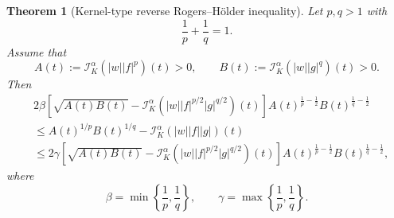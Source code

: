 \documentclass[11pt]{article}
\newtheorem{theorem}{Theorem}[section]
\begin{document}
\begin{theorem}[Kernel-type reverse Rogers--H\"older inequality]
Let $p,q>1$ with
\[
    \frac1p+\frac1q=1.
\]
Assume that
\[
    A(t):=\mathcal{I}_{K}^{\alpha}(|w||f|^p)(t)>0,
    \qquad
    B(t):=\mathcal{I}_{K}^{\alpha}(|w||g|^q)(t)>0.
\]
Then
\[
\begin{aligned}
&2\beta
\left[
\sqrt{A(t)B(t)}
-
\mathcal{I}_{K}^{\alpha}
\left(|w||f|^{p/2}|g|^{q/2}\right)(t)
\right]
A(t)^{\frac1p-\frac12}
B(t)^{\frac1q-\frac12}                                      \\
&\leq
A(t)^{1/p}B(t)^{1/q}
-
\mathcal{I}_{K}^{\alpha}(|w||f||g|)(t)                       \\
&\leq
2\gamma
\left[
\sqrt{A(t)B(t)}
-
\mathcal{I}_{K}^{\alpha}
\left(|w||f|^{p/2}|g|^{q/2}\right)(t)
\right]
A(t)^{\frac1p-\frac12}
B(t)^{\frac1q-\frac12},
\end{aligned}
\]
where
\[
    \beta=\min\left\{\frac1p,\frac1q\right\},
    \qquad
    \gamma=\max\left\{\frac1p,\frac1q\right\}.
\]
\end{theorem}
\end{document}
